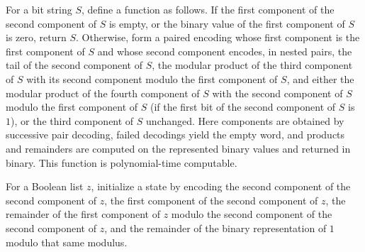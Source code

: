 \begin{theorem}
\label{Complexity.BinArith.polyTimeComputable_powStep}
\leanok
{}
For a bit string $S$, define a function as follows. If the first component of the second
component of $S$ is empty, or the binary value of the first component of $S$ is zero,
return $S$. Otherwise, form a paired encoding whose first component is the first
component of $S$ and whose second component encodes, in nested pairs, the tail of the
second component of $S$, the modular product of the third component of $S$ with its
second component modulo the first component of $S$, and either the modular product of
the fourth component of $S$ with the second component of $S$ modulo the first component
of $S$ (if the first bit of the second component of $S$ is $1$), or the third component
of $S$ unchanged. Here components are obtained by successive pair decoding, failed
decodings yield the empty word, and products and remainders are computed on the
represented binary values and returned in binary. This function is polynomial-time
computable.
\end{theorem}

\begin{definition}
\label{Complexity.BinArith.powInit}
\leanok
{}
For a Boolean list $z$, initialize a state by encoding the second component of the
second component of $z$, the first component of the second component of $z$, the
remainder of the first component of $z$ modulo the second component of the second
component of $z$, and the remainder of the binary representation of $1$ modulo that same
modulus.
\end{definition}


